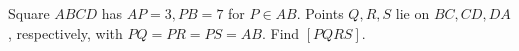 Square $ABCD$ has $AP=3,PB=7$ for $P\in AB$. Points $Q,R,S$ lie on $BC,CD,DA$, respectively, with $PQ=PR=PS=AB$. Find $[PQRS]$.
